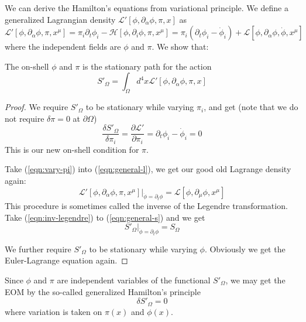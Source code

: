 \documentclass[12pt]{book}
\begin{document}
	We can derive the Hamilton's equations from variational principle. We define a generalized Lagrangian density $\mathcal{L}'[\phi,\partial_\alpha\phi,\pi,x]$ as
	\begin{equation}
		\mathcal{L}'[\phi,\partial_\alpha\phi,\pi,x^\mu]=\pi_i\partial_t\phi_i-\mathcal{H}[\phi,\partial_i\phi,\pi,x^\mu]=\pi_i(\partial_t\phi_i-\dot\phi_i)+\mathcal{L}[\phi,\partial_\alpha\phi,\dot\phi,x^\mu] \label{eqn:general-l}
	\end{equation}
	where the independent fields are $\phi$ and $\pi$. We show that:	
	\begin{lemma}
		The on-shell $\phi$ and $\pi$ is the stationary path for the action
		\begin{equation}
			S'_\Omega=\int_{\Omega}d^4x\mathcal{L}'[\phi,\partial_\alpha\phi,\pi,x] \label{eqn:general-s}
		\end{equation}
	\end{lemma}
	\begin{proof}
	We require $S'_\Omega$ to be stationary while varying $\pi_i$, and get (note that we do not require $\delta\pi=0$ at $\partial\Omega$)	
	\begin{equation}
		\frac{\delta S'_\Omega}{\delta \pi_i}=\frac{\partial \mathcal{L}'}{\partial \pi_i}=\partial_t\phi_i-\dot\phi_i=0 \label{eqn:vary-pi}
	\end{equation}
	This is our new on-shell condition for $\pi$.
	
	Take (\ref{eqn:vary-pi}) into (\ref{eqn:general-l}), we get our good old Lagrange density again:	
	\begin{equation}
		\mathcal{L}'[\phi,\partial_\alpha\phi,\pi,x^\mu]\big|_{\dot\phi=\partial_t\phi}=\mathcal{L}[\phi,\partial_\mu\phi,x^\mu] \label{eqn:inv-legendre}
	\end{equation}
	This procedure is sometimes called the inverse of the Legendre transformation. Take (\ref{eqn:inv-legendre}) to (\ref{eqn:general-s}) and we get 	
	\begin{equation}
		S'_\Omega\big|_{\dot\phi=\partial_t\phi}=S_\Omega
	\end{equation}	
	
	We further require $S'_\Omega$ to be stationary while varying $\phi$. Obviously we get the Euler-Lagrange equation again.
	\end{proof}
	
	
	Since $\phi$ and $\pi$ are independent variables of the functional $S'_\Omega$, we may get the EOM by the so-called generalized Hamilton's principle	
	\begin{equation}
		\delta S'_\Omega=0
	\end{equation}
	where variation is taken on $\pi(x)$ and $\phi(x)$.
	
\end{document}
